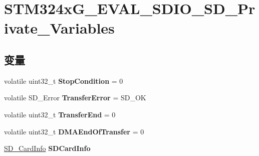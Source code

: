 \hypertarget{group___s_t_m324x_g___e_v_a_l___s_d_i_o___s_d___private___variables}{}\section{S\+T\+M324x\+G\+\_\+\+E\+V\+A\+L\+\_\+\+S\+D\+I\+O\+\_\+\+S\+D\+\_\+\+Private\+\_\+\+Variables}
\label{group___s_t_m324x_g___e_v_a_l___s_d_i_o___s_d___private___variables}
\subsection*{变量}
\begin{DoxyCompactItemize}
\item 
volatile uint32\+\_\+t {\bfseries Stop\+Condition} = 0\hypertarget{group___s_t_m324x_g___e_v_a_l___s_d_i_o___s_d___private___variables_gaca9d38169402effc401361f52be012b7}{}\label{group___s_t_m324x_g___e_v_a_l___s_d_i_o___s_d___private___variables_gaca9d38169402effc401361f52be012b7}

\item 
volatile S\+D\+\_\+\+Error {\bfseries Transfer\+Error} = S\+D\+\_\+\+OK\hypertarget{group___s_t_m324x_g___e_v_a_l___s_d_i_o___s_d___private___variables_ga693e3b9d09509f9fd42386a5fc31bd0d}{}\label{group___s_t_m324x_g___e_v_a_l___s_d_i_o___s_d___private___variables_ga693e3b9d09509f9fd42386a5fc31bd0d}

\item 
volatile uint32\+\_\+t {\bfseries Transfer\+End} = 0\hypertarget{group___s_t_m324x_g___e_v_a_l___s_d_i_o___s_d___private___variables_ga2504eb031f79ab67e7b175815ea10cfc}{}\label{group___s_t_m324x_g___e_v_a_l___s_d_i_o___s_d___private___variables_ga2504eb031f79ab67e7b175815ea10cfc}

\item 
volatile uint32\+\_\+t {\bfseries D\+M\+A\+End\+Of\+Transfer} = 0\hypertarget{group___s_t_m324x_g___e_v_a_l___s_d_i_o___s_d___private___variables_gab4965c9dd85c339abfefd3fa9bf30bf4}{}\label{group___s_t_m324x_g___e_v_a_l___s_d_i_o___s_d___private___variables_gab4965c9dd85c339abfefd3fa9bf30bf4}

\item 
\hyperlink{struct_s_d___card_info}{S\+D\+\_\+\+Card\+Info} {\bfseries S\+D\+Card\+Info}\hypertarget{group___s_t_m324x_g___e_v_a_l___s_d_i_o___s_d___private___variables_gad9b4efaae93cd75532b18c0528a4ca3d}{}\label{group___s_t_m324x_g___e_v_a_l___s_d_i_o___s_d___private___variables_gad9b4efaae93cd75532b18c0528a4ca3d}


\end{DoxyCompactItemize}
